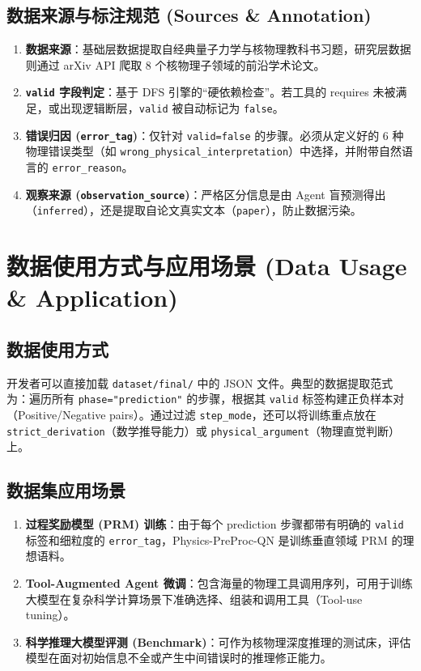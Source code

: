 \documentclass[12pt,a4paper]{article}
\begin{document}
\subsection{数据来源与标注规范 (Sources \& Annotation)}
\begin{enumerate}
\item \textbf{数据来源}：基础层数据提取自经典量子力学与核物理教科书习题，研究层数据则通过 arXiv API 爬取 8 个核物理子领域的前沿学术论文。
\item \textbf{\texttt{valid} 字段判定}：基于 DFS 引擎的“硬依赖检查”。若工具的 requires 未被满足，或出现逻辑断层，\texttt{valid} 被自动标记为 \texttt{false}。
\item \textbf{错误归因 (\texttt{error\_tag})}：仅针对 \texttt{valid=false} 的步骤。必须从定义好的 6 种物理错误类型（如 \texttt{wrong\_physical\_interpretation}）中选择，并附带自然语言的 \texttt{error\_reason}。
\item \textbf{观察来源 (\texttt{observation\_source})}：严格区分信息是由 Agent 盲预测得出（\texttt{inferred}），还是提取自论文真实文本（\texttt{paper}），防止数据污染。
\end{enumerate}

\section{数据使用方式与应用场景 (Data Usage \& Application)}

\subsection{数据使用方式}
开发者可以直接加载 \texttt{dataset/final/} 中的 JSON 文件。典型的数据提取范式为：遍历所有 \texttt{phase="prediction"} 的步骤，根据其 \texttt{valid} 标签构建正负样本对（Positive/Negative pairs）。通过过滤 \texttt{step\_mode}，还可以将训练重点放在 \texttt{strict\_derivation}（数学推导能力）或 \texttt{physical\_argument}（物理直觉判断）上。

\subsection{数据集应用场景}
\begin{enumerate}
\item \textbf{过程奖励模型 (PRM) 训练}：由于每个 prediction 步骤都带有明确的 \texttt{valid} 标签和细粒度的 \texttt{error\_tag}，Physics-PreProc-QN 是训练垂直领域 PRM 的理想语料。
\item \textbf{Tool-Augmented Agent 微调}：包含海量的物理工具调用序列，可用于训练大模型在复杂科学计算场景下准确选择、组装和调用工具（Tool-use tuning）。\item \textbf{科学推理大模型评测 (Benchmark)}：可作为核物理深度推理的测试床，评估模型在面对初始信息不全或产生中间错误时的推理修正能力。
\end{enumerate}
\end{document}
